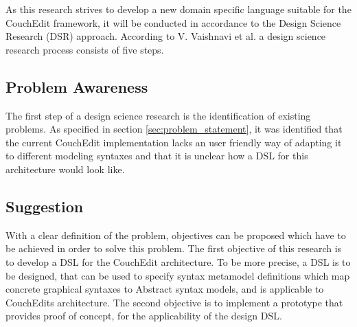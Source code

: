 \documentclass[10pt,a4paper,oneside]{scrartcl}
\begin{document}






As this research strives to develop a new domain specific language suitable for the CouchEdit framework, it will be conducted in accordance to the Design Science Research (DSR) approach. According to V. Vaishnavi et al. a design science research process consists of five steps\cite{Vaishnavi2004}.

\subsection{Problem Awareness}
The first step of a design science research is the identification of existing problems. As specified in section \ref{sec:problem_statement}, it was identified that the current CouchEdit implementation lacks an user friendly way of adapting it to different modeling syntaxes and that it is unclear how a DSL for this architecture would look like.

\subsection{Suggestion}
With a clear definition of the problem, objectives can be proposed which have to be achieved in order to solve this problem. The first objective of this research is to develop a DSL for the CouchEdit architecture. To be more precise, a DSL is to be designed, that can be used to specify syntax metamodel definitions which map concrete graphical syntaxes to Abstract syntax models, and is applicable to CouchEdits architecture. The second objective is to implement a prototype that provides proof of concept, for the applicability of the design DSL.
\end{document}
